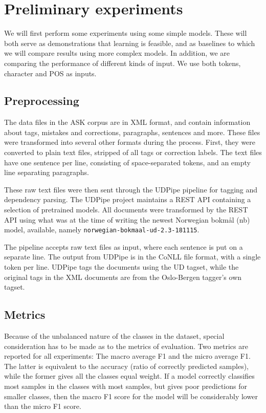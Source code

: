 \chapter{Preliminary experiments}

We will first perform some experiments using some simple models. These will
both serve as demonstrations that learning is feasible, and as baselines
to which we will compare results using more complex models. In addition,
we are comparing the performance of different kinds of input. We use both
tokens, character \ngrams and \ac{POS} \ngrams as inputs.

\section{Preprocessing}

The data files in the ASK corpus are in \ac{XML} format, and contain information
about tags, mistakes and corrections, paragraphs, sentences and more. These
files were transformed into several other formats during the process. First,
they were converted to plain text files, stripped of all tags or correction
labels. The text files have one sentence per line, consisting of
space-separated tokens, and an empty line separating paragraphs.

These raw text files were then sent through the UDPipe pipeline
\autocite{udpipe:2017} for tagging and dependency parsing. The UDPipe project
maintains a \ac{REST} \ac{API} containing a selection of pretrained models. All
documents were transformed by the \ac{REST} \ac{API} using what was at the time of
writing the newest Norwegian bokmål (nb) model, available, namely
\texttt{norwegian-bokmaal-ud-2.3-181115}.

The pipeline accepts raw text files as input, where each sentence is put on a
separate line. The output from UDPipe is in the CoNLL file format, with a
single token per line. UDPipe tags the documents using the UD tagset, while
the original tags in the \ac{XML} documents are from the Oslo-Bergen tagger's own
tagset.

\section{Metrics}

Because of the unbalanced nature of the classes in the dataset, special
consideration has to be made as to the metrics of evaluation. Two metrics are
reported for all experiments: The macro average F1 and the micro average F1.
The latter is equivalent to the accuracy (ratio of correctly predicted
samples), while the former gives all the classes equal weight. If a model
correctly classifies most samples in the classes with most samples, but gives
poor predictions for smaller classes, then the macro F1 score for the model
will be considerably lower than the micro F1 score.

